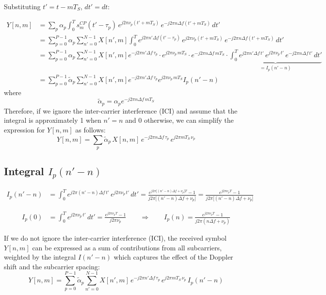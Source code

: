 \documentclass[11pt]{article}
\begin{document}
\noindent Substituting $t' = t - mT_S$, $dt' = dt$:

\begin{align}
Y[n,m]
&= \sum_p \alpha_p
   \int_0^T s_m^{CP}(t' - \tau_p)\,
   e^{j2\pi \nu_p(t' + mT_S)}\,
   e^{-j2\pi n\Delta f(t' + mT_S)}\, dt' \\[6pt]
&= \sum_{p=0}^{P-1} \alpha_p
   \sum_{n'=0}^{N-1} X[n',m]
   \int_0^T
   e^{j2\pi n'\Delta f(t' - \tau_p)}\,
   e^{j2\pi \nu_p(t' + mT_S)}\,
   e^{-j2\pi n\Delta f(t' + mT_S)}\, dt' \\
   &= \sum_{p=0}^{P-1} \alpha_p
   \sum_{n'=0}^{N-1} X[n',m] 
   {e^{-j2\pi n'\Delta f\, \tau_p}}
    \cdot
    {e^{j2\pi \nu_p\, mT_S}}
    \cdot
    {e^{-j2\pi n\Delta f\, mT_S}}
    \cdot
    \underbrace{
    \int_0^T e^{j2\pi n'\Delta f\, t'}\,
                e^{j2\pi \nu_p\, t'}\,
                e^{-j2\pi n\Delta f\, t'}\, dt'
    }_{\displaystyle = I_p(n'- n)} \\
    &=  \sum_{p=0}^{P-1} \tilde{\alpha}_p
   \sum_{n'=0}^{N-1} X[n',m] 
   {e^{-j2\pi n'\Delta f\, \tau_p}}
    {e^{j2\pi \nu_p\, mT_S}}
    I_p(n'-n)
\end{align}
where
\begin{equation}
    \tilde{\alpha}_p = \alpha_p e^{-j2\pi n\Delta f\, mT_S}
\end{equation}
Therefore, if we ignore the inter-carrier interference (ICI) and assume that the integral is approximately 1 when \(n' = n\) and 0 otherwise, we can simplify the expression for \(Y[n,m]\) as follows:
\begin{equation}
Y[n,m]
= \sum_p \tilde{\alpha}_p\, X[n,m]\,
  e^{-j2\pi n\Delta f\, \tau_p}\,
  e^{j2\pi mT_S\, \nu_p}
\end{equation}

\subsection*{Integral $I_p(n'-n)$}

\begin{align}
I_p(n'-n)
&= \int_0^T e^{j2\pi(n'-n)\Delta f\, t'}\,
             e^{j2\pi \nu_p\, t'}\, dt'
 = \frac{e^{j2\pi\bigl[(n'-n)\Delta f + \nu_p\bigr]T} - 1}
        {j2\pi\bigl[(n'-n)\Delta f + \nu_p\bigr]}
 = \frac{e^{j2\pi\nu_pT} - 1}
        {j2\pi\bigl[(n'-n)\Delta f + \nu_p\bigr]}
\end{align}

\begin{align}
I_p(0)
&= \int_0^T e^{j2\pi \nu_p\, t'}\, dt'
 = \frac{e^{j2\pi \nu_p T} - 1}{j2\pi\nu_p}
\qquad\Longrightarrow\qquad
I_p(n)
 = \frac{e^{j2\pi \nu_p T} - 1}{j2\pi(n\Delta f + \nu_p)}
\end{align}

If we do not ignore the inter-carrier interference (ICI), the received symbol \(Y[n,m]\) can be expressed as a sum of contributions from all subcarriers, weighted by the integral \(I(n'-n)\) which captures the effect of the Doppler shift and the subcarrier spacing:
\begin{equation}
Y[n,m]
= \sum_{p=0}^{P-1} \tilde{\alpha}_p
  \sum_{n'=0}^{N-1} X[n',m]\,
  e^{-j2\pi n'\Delta f\, \tau_p}\,
  e^{j2\pi mT_S\, \nu_p}\,
  I_p(n'-n) 
\end{equation}
\end{document}
